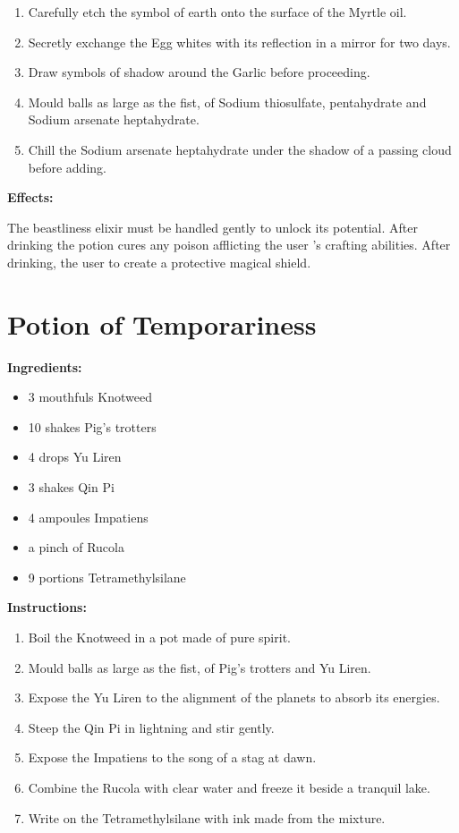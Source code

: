 \documentclass{article}
\begin{document}
\begin{enumerate}
  \item Carefully etch the symbol of earth onto the surface of the Myrtle oil.
  \item Secretly exchange the Egg whites with its reflection in a mirror for two days.
  \item Draw symbols of shadow around the Garlic before proceeding.
  \item Mould balls as large as the fist, of Sodium thiosulfate, pentahydrate and Sodium arsenate heptahydrate.
  \item Chill the Sodium arsenate heptahydrate under the shadow of a passing cloud before adding.
\end{enumerate}

\textbf{Effects:}

The beastliness elixir must be handled gently to unlock its potential. After drinking the potion cures any poison afflicting the user 's crafting abilities. After drinking, the user to create a protective magical shield.

\newpage
\section*{Potion of Temporariness}

\textbf{Ingredients:}

\begin{itemize}
  \item 3 mouthfuls Knotweed
  \item 10 shakes Pig's trotters
  \item 4 drops Yu Liren
  \item 3 shakes Qin Pi
  \item 4 ampoules Impatiens
  \item a pinch of Rucola
  \item 9 portions Tetramethylsilane
\end{itemize}

\textbf{Instructions:}

\begin{enumerate}
  \item Boil the Knotweed in a pot made of pure spirit.
  \item Mould balls as large as the fist, of Pig's trotters and Yu Liren.
  \item Expose the Yu Liren to the alignment of the planets to absorb its energies.
  \item Steep the Qin Pi in lightning and stir gently.
  \item Expose the Impatiens to the song of a stag at dawn.
  \item Combine the Rucola with clear water and freeze it beside a tranquil lake.
  \item Write on the Tetramethylsilane with ink made from the mixture.
\end{enumerate}
\end{document}
